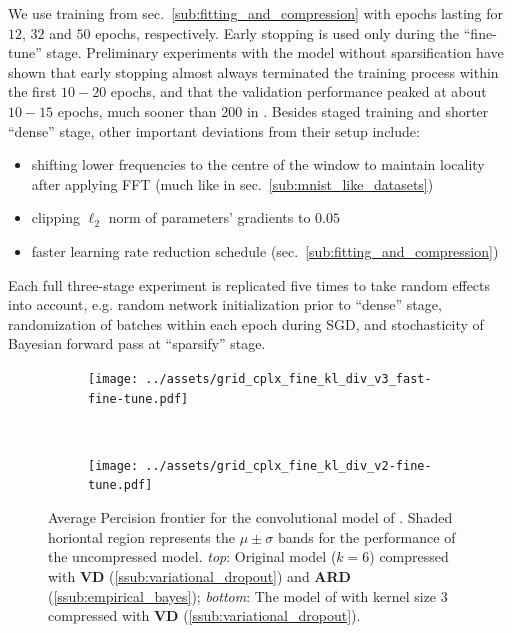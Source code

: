 \documentclass[a4paper,10pt]{article}
\begin{document}
We use training from sec.~\ref{sub:fitting_and_compression} with epochs lasting for $12$,
$32$ and $50$ epochs, respectively. Early stopping is used only during the ``fine-tune''
stage. Preliminary experiments with the model without sparsification have shown that early
stopping almost always terminated the training process within the first $10-20$ epochs,
and that the validation performance peaked at about $10-15$ epochs, much sooner than $200$
in \citep{trabelsi_deep_2017}. Besides staged training and shorter ``dense'' stage, other
important deviations from their setup include:
\begin{itemize}
  \item shifting lower frequencies to the centre of the window to maintain locality after
  applying FFT (much like in sec.~\ref{sub:mnist_like_datasets})
  \item clipping $\ell_2$ norm of parameters' gradients to $0.05$
  \item faster learning rate reduction schedule (sec.~\ref{sub:fitting_and_compression})
\end{itemize}
Each full three-stage experiment is replicated five times to take random effects into account,
e.g. random network initialization prior to ``dense'' stage, randomization of batches within
each epoch during SGD, and stochasticity of Bayesian forward pass at ``sparsify'' stage.


\begin{figure}[!ht]
  \centering
  \begin{subfigure}[b]{0.9\textwidth}  %
    \centering
    \texttt{[image: ../assets/grid\_cplx\_fine\_kl\_div\_v3\_fast-fine-tune.pdf]}
  \end{subfigure} \\
  \begin{subfigure}[b]{0.9\textwidth}  %
    \centering
    \texttt{[image: ../assets/grid\_cplx\_fine\_kl\_div\_v2-fine-tune.pdf]}
  \end{subfigure}
  \caption{%
    Average Percision frontier for the convolutional model of \citet{trabelsi_deep_2017}.
    Shaded horiontal region represents the $\mu\pm\sigma$ bands for the performance of the
    uncompressed model.
    \textit{top}: Original model ($k=6$) compressed with \textbf{\color{orange} VD}
    (\ref{ssub:variational_dropout}) and \textbf{\color{blue} ARD} (\ref{ssub:empirical_bayes});
    \textit{bottom}: The model of \citep{trabelsi_deep_2017} with kernel size $3$
    compressed with \textbf{\color{blue} VD} (\ref{ssub:variational_dropout}).
  }
  \label{fig:musicnet_trade-off}
\end{figure}
\end{document}
